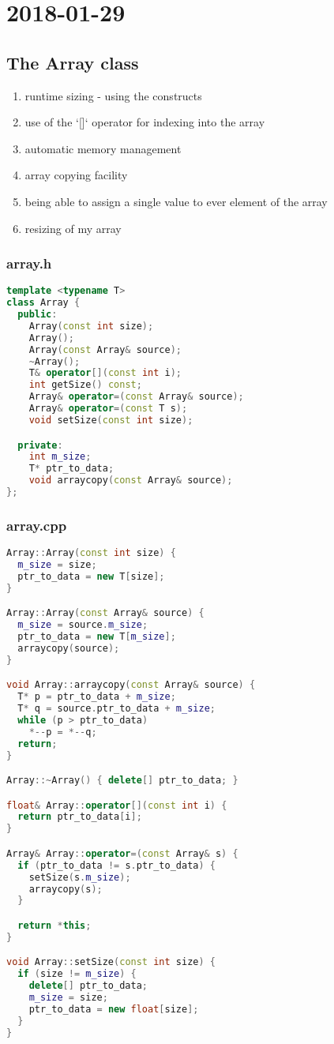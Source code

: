 \section{2018-01-29}

\subsection{The Array class}

\begin{enumerate}
  \item runtime sizing - using the constructs
  \item use of the `[]` operator for indexing into the array
  \item automatic memory management
  \item array copying facility
  \item being able to assign a single value to ever element of the array
  \item resizing of my array
\end{enumerate}

\subsubsection{array.h}

\begin{lstlisting}[language=C++]
template <typename T>
class Array {
  public:
    Array(const int size);
    Array();
    Array(const Array& source);
    ~Array();
    T& operator[](const int i);
    int getSize() const;
    Array& operator=(const Array& source);
    Array& operator=(const T s);
    void setSize(const int size);

  private:
    int m_size;
    T* ptr_to_data;
    void arraycopy(const Array& source);
};
\end{lstlisting}

\subsubsection{array.cpp}

\begin{lstlisting}[language=C++]
Array::Array(const int size) {
  m_size = size;
  ptr_to_data = new T[size];
}

Array::Array(const Array& source) {
  m_size = source.m_size;
  ptr_to_data = new T[m_size];
  arraycopy(source);
}

void Array::arraycopy(const Array& source) {
  T* p = ptr_to_data + m_size;
  T* q = source.ptr_to_data + m_size;
  while (p > ptr_to_data)
    *--p = *--q;
  return;
}

Array::~Array() { delete[] ptr_to_data; }

float& Array::operator[](const int i) {
  return ptr_to_data[i];
}

Array& Array::operator=(const Array& s) {
  if (ptr_to_data != s.ptr_to_data) {
    setSize(s.m_size);
    arraycopy(s);
  }

  return *this;
}

void Array::setSize(const int size) {
  if (size != m_size) {
    delete[] ptr_to_data;
    m_size = size;
    ptr_to_data = new float[size];
  }
}
\end{lstlisting}